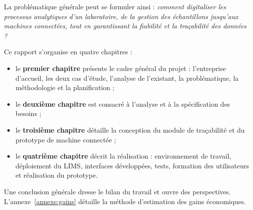 La problématique générale peut se formuler ainsi : \emph{comment digitaliser les processus analytiques d'un laboratoire, de la gestion des échantillons jusqu'aux machines connectées, tout en garantissant la fiabilité et la traçabilité des données ?}

Ce rapport s'organise en quatre chapitres :
\begin{itemize}
  \item le \textbf{premier chapitre} présente le cadre général du projet : l'entreprise d'accueil, les deux cas d'étude, l'analyse de l'existant, la problématique, la méthodologie et la planification ;
  \item le \textbf{deuxième chapitre} est consacré à l'analyse et à la spécification des besoins ;
  \item le \textbf{troisième chapitre} détaille la conception du module de traçabilité et du prototype de machine connectée ;
  \item le \textbf{quatrième chapitre} décrit la réalisation : environnement de travail, déploiement du \ac{LIMS}, interfaces développées, tests, formation des utilisateurs et réalisation du prototype.
\end{itemize}
Une conclusion générale dresse le bilan du travail et ouvre des perspectives. L'annexe~\ref{annexe:gains} détaille la méthode d'estimation des gains économiques.
